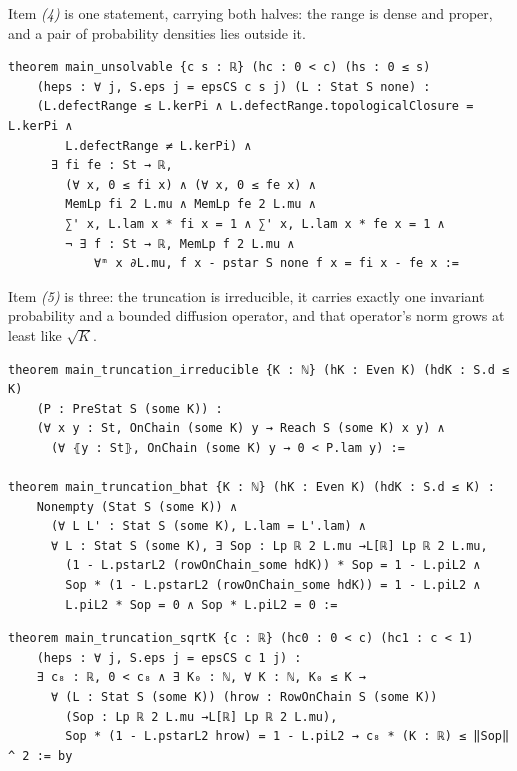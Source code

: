 Item \emph{(4)} is one statement, carrying both halves: the range is dense and proper, and a
pair of probability densities lies outside it.
\begin{lstlisting}[style=lean]
theorem main_unsolvable {c s : ℝ} (hc : 0 < c) (hs : 0 ≤ s)
    (heps : ∀ j, S.eps j = epsCS c s j) (L : Stat S none) :
    (L.defectRange ≤ L.kerPi ∧ L.defectRange.topologicalClosure = L.kerPi ∧
        L.defectRange ≠ L.kerPi) ∧
      ∃ fi fe : St → ℝ,
        (∀ x, 0 ≤ fi x) ∧ (∀ x, 0 ≤ fe x) ∧
        MemLp fi 2 L.mu ∧ MemLp fe 2 L.mu ∧
        ∑' x, L.lam x * fi x = 1 ∧ ∑' x, L.lam x * fe x = 1 ∧
        ¬ ∃ f : St → ℝ, MemLp f 2 L.mu ∧
            ∀ᵐ x ∂L.mu, f x - pstar S none f x = fi x - fe x :=
\end{lstlisting}

Item \emph{(5)} is three: the truncation is irreducible, it carries exactly one invariant
probability and a bounded diffusion operator, and that operator's norm grows at least like
$\sqrt K$.
\begin{lstlisting}[style=lean]
theorem main_truncation_irreducible {K : ℕ} (hK : Even K) (hdK : S.d ≤ K)
    (P : PreStat S (some K)) :
    (∀ x y : St, OnChain (some K) y → Reach S (some K) x y) ∧
      (∀ ⦃y : St⦄, OnChain (some K) y → 0 < P.lam y) :=

theorem main_truncation_bhat {K : ℕ} (hK : Even K) (hdK : S.d ≤ K) :
    Nonempty (Stat S (some K)) ∧
      (∀ L L' : Stat S (some K), L.lam = L'.lam) ∧
      ∀ L : Stat S (some K), ∃ Sop : Lp ℝ 2 L.mu →L[ℝ] Lp ℝ 2 L.mu,
        (1 - L.pstarL2 (rowOnChain_some hdK)) * Sop = 1 - L.piL2 ∧
        Sop * (1 - L.pstarL2 (rowOnChain_some hdK)) = 1 - L.piL2 ∧
        L.piL2 * Sop = 0 ∧ Sop * L.piL2 = 0 :=
\end{lstlisting}
\begin{lstlisting}[style=lean]
theorem main_truncation_sqrtK {c : ℝ} (hc0 : 0 < c) (hc1 : c < 1)
    (heps : ∀ j, S.eps j = epsCS c 1 j) :
    ∃ c₈ : ℝ, 0 < c₈ ∧ ∃ K₀ : ℕ, ∀ K : ℕ, K₀ ≤ K →
      ∀ (L : Stat S (some K)) (hrow : RowOnChain S (some K))
        (Sop : Lp ℝ 2 L.mu →L[ℝ] Lp ℝ 2 L.mu),
        Sop * (1 - L.pstarL2 hrow) = 1 - L.piL2 → c₈ * (K : ℝ) ≤ ‖Sop‖ ^ 2 := by
\end{lstlisting}

